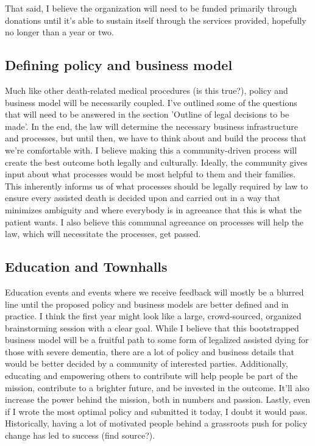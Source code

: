 \documentclass{proposalnsf}
\begin{document}
That said, I believe the organization will need to be funded primarily through donations until it's able to sustain itself through the services provided, hopefully no longer than a year or two.

\subsection{Defining policy and business model}
Much like other death-related medical procedures (is this true?), policy and business model will be necessarily coupled. I've outlined some of the questions that will need to be answered in the section 'Outline of legal decisions to be made'. In the end, the law will determine the necessary business infrastructure and processes, but until then, we have to think about and build the process that we're comfortable with. I believe making this a community-driven process will create the best outcome both legally and culturally. Ideally, the community gives input about what processes would be most helpful to them and their families. This inherently informs us of what processes should be legally required by law to ensure every assisted death is decided upon and carried out in a way that minimizes ambiguity and where everybody is in agreeance that this is what the patient wants. I also believe this communal agreeance on processes will help the law, which will necessitate the processes, get passed.

\subsection{Education and Townhalls}
Education events and events where we receive feedback will mostly be a blurred line until the proposed policy and business models are better defined and in practice. I think the first year might look like a large, crowd-sourced, organized brainstorming session with a clear goal. While I believe that this bootstrapped business model will be a fruitful path to some form of legalized assisted dying for those with severe dementia, there are a lot of policy and business details that would be better decided by a community of interested parties. Additionally, educating and empowering others to contribute will help people be part of the mission, contribute to a brighter future, and be invested in the outcome. It'll also increase the power behind the mission, both in numbers and passion. Lastly, even if I wrote the most optimal policy and submitted it today, I doubt it would pass. Historically, having a lot of motivated people behind a grassroots push for policy change has led to success (find source?).
\end{document}
